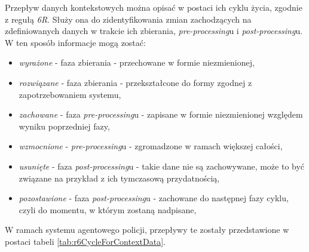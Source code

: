 \par Przepływ danych kontekstowych można opisać w postaci ich cyklu życia, zgodnie z regułą \emph{6R}\cite{Klimek2023}. Służy ona do zidentyfikowania zmian zachodzących na zdefiniowanych danych w trakcie ich zbierania, \emph{pre-processing}u i \emph{post-processing}u. W ten sposób informacje mogą zostać:
\begin{itemize}
    \item \emph{wyrażone} - faza zbierania - przechowane w formie niezmienionej,
    \item \emph{rozwiązane} - faza zbierania - przekształcone do formy zgodnej z zapotrzebowaniem systemu,
    \item \emph{zachowane} - faza \emph{pre-processing}u - zapisane w formie niezmienionej względem wyniku poprzedniej fazy,
    \item \emph{wzmocnione} - \emph{pre-processing}u - zgromadzone w ramach większej całości,
    \item \emph{usunięte} - faza \emph{post-processing}u - takie dane nie są zachowywane, może to być związane na przykład z ich tymczasową przydatnością,
    \item \emph{pozostawione} - faza \emph{post-processing}u - zachowane do następnej fazy cyklu, czyli do momentu, w którym zostaną nadpisane,
\end{itemize}
W ramach systemu agentowego policji, przepływy te zostały przedstawione w postaci tabeli \ref{tab:r6CycleForContextData}.

